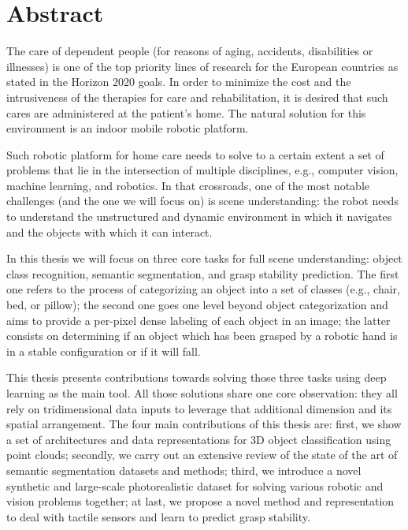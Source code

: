 \chapter{Abstract}

The care of dependent people (for reasons of aging, accidents, disabilities or illnesses) is one of the top priority lines of research for the European countries as stated in the Horizon 2020 goals. In order to minimize the cost and the intrusiveness of the therapies for care and rehabilitation, it is desired that such cares are administered at the patient's home. The natural solution for this environment is an indoor mobile robotic platform.

Such robotic platform for home care needs to solve to a certain extent a set of problems that lie in the intersection of multiple disciplines, e.g., computer vision, machine learning, and robotics. In that crossroads, one of the most notable challenges (and the one we will focus on) is scene understanding: the robot needs to understand the unstructured and dynamic environment in which it navigates and the objects with which it can interact.

In this thesis we will focus on three core tasks for full scene understanding: object class recognition, semantic segmentation, and grasp stability prediction. The first one refers to the process of categorizing an object into a set of classes (e.g., chair, bed, or pillow); the second one goes one level beyond object categorization and aims to provide a per-pixel dense labeling of each object in an image; the latter consists on determining if an object which has been grasped by a robotic hand is in a stable configuration or if it will fall.

This thesis presents contributions towards solving those three tasks using deep learning as the main tool. All those solutions share one core observation: they all rely on tridimensional data inputs to leverage that additional dimension and its spatial arrangement. The four main contributions of this thesis are: first, we show a set of architectures and data representations for 3D object classification using point clouds; secondly, we carry out an extensive review of the state of the art of semantic segmentation datasets and methods; third, we introduce a novel synthetic and large-scale photorealistic dataset for solving various robotic and vision problems together; at last, we propose a novel method and representation to deal with tactile sensors and learn to predict grasp stability.  